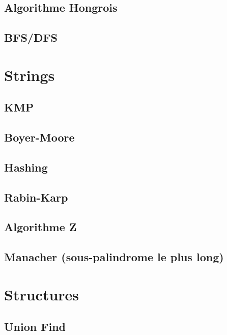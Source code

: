 \documentclass[10pt]{article}
\begin{document}
\subsection{Algorithme Hongrois}
{\scriptsize}

\subsection{BFS/DFS}
{\scriptsize}


\section{Strings}
\subsection{KMP}
{\scriptsize}

\subsection{Boyer-Moore}
{\scriptsize}

\subsection{Hashing}
{\scriptsize}

\subsection{Rabin-Karp}
{\scriptsize}

\subsection{Algorithme Z}
{\scriptsize}

\subsection{Manacher (sous-palindrome le plus long)}
{\scriptsize}


\section{Structures}
\subsection{Union Find}
{\scriptsize}
\end{document}
